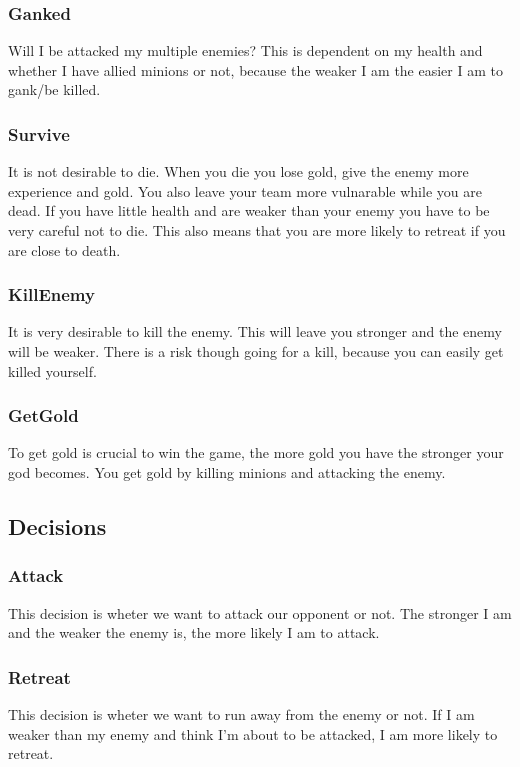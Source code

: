 \documentclass[titlepage]{article}
\begin{document}
\subsubsection*{Ganked}
Will I be attacked my multiple enemies? This is dependent on my health and whether I have allied minions or not, because the weaker I am the easier I am to gank/be killed.

\subsubsection*{Survive}
It is not desirable to die. When you die you lose gold, give the enemy more experience and gold. You also leave your team more vulnarable while you are dead. If you have little health and are weaker than your enemy you have to be very careful not to die. This also means that you are more likely to retreat if you are close to death.

\subsubsection*{KillEnemy}
It is very desirable to kill the enemy. This will leave you stronger and the enemy will be weaker. There is a risk though going for a kill, because you can easily get killed yourself.

\subsubsection*{GetGold}
To get gold is crucial to win the game, the more gold you have the stronger your god becomes. You get gold by killing minions and attacking the enemy.


\subsection{Decisions}

\subsubsection*{Attack}
This decision is wheter we want to attack our opponent or not. The stronger I am and the weaker the enemy is, the more likely I am to attack.

\subsubsection*{Retreat}
This decision is wheter we want to run away from the enemy or not. If I am weaker than my enemy and think I'm about to be attacked, I am more likely to retreat.
\end{document}
